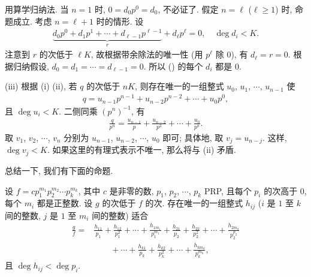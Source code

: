 \begin{pf}
    用算学归纳法. 当 $n = 1$ 时, $0 = d_0 p^0 = d_0$, 不必证了. 假定 $n = \ell$ ($\ell \geq 1$) 时, 命题成立. 考虑 $n = \ell + 1$ 时的情形. 设
    \begin{align*}
        {\underbrace{d_0 p^0 + d_1 p^1 + \cdots + d_{\ell - 1} p^{\ell - 1}}_{r}} + d_\ell p^\ell = 0, \quad \deg d_i < K.
    \end{align*}
    注意到 $r$ 的次低于 $\ell K$, 故根据带余除法的唯一性 (用 $p^\ell$ 除 $0$), 有 $d_\ell = r = 0$. 根据归纳假设, $d_0 = d_1 = \cdots = d_{\ell - 1} = 0$. 所以 () 的每个 $d_i$ 都是 $0$.

    (iii) 根据 (i) (ii), 若 $q$ 的次低于 $nK$, 则存在唯一的一组整式 $u_0$, $u_1$, $\cdots$, $u_{n-1}$ 使
    \begin{align*}
        q = u_{n-1} p^{n-1} + u_{n-2} p^{n-2} + \cdots + u_0 p^0,
    \end{align*}
    且 $\deg u_i < K$. 二侧同乘 $(p^n)^{-1}$, 有
    \begin{align*}
        \frac{q}{p^n} = \frac{u_{n-1}}{p} + \frac{u_{n-2}}{p^2} + \cdots + \frac{u_0}{p^n}.
    \end{align*}
    取 $v_1$, $v_2$, $\cdots$, $v_n$ 分别为 $u_{n-1}$, $u_{n-2}$, $\cdots$, $u_0$ 即可; 具体地, 取 $v_j = u_{n-j}$. 这样, $\deg v_j < K$. 如果这里的有理式表示不唯一, 那么将与 (ii) 矛盾.
\end{pf}

总结一下, 我们有下面的命题.
\begin{proposition}
    设 $f = c p_1^{m_1} p_2^{m_2} \cdots p_k^{m_k}$, 其中 $c$ 是非零的数, $p_1$, $p_2$, $\cdots$, $p_k$ PRP, 且每个 $p_i$ 的次高于 $0$, 每个 $m_i$ 都是正整数. 设 $g$ 的次低于 $f$ 的次. 存在唯一的一组整式 $h_{ij}$ ($i$ 是 $1$ 至 $k$ 间的整数, $j$ 是 $1$ 至 $m_i$ 间的整数) 适合
    \begin{align*}
        \frac{g}{f}
        = {} & \frac{h_{11}}{p_1} + \frac{h_{12}}{p_1^2} + \cdots + \frac{h_{1 m_1}}{p_1^{m_1}} + \frac{h_{21}}{p_2} + \frac{h_{22}}{p_2^2} + \cdots + \frac{h_{2 m_2}}{p_2^{p_2}} \\
             & \qquad + \cdots + \frac{h_{k1}}{p_k} + \frac{h_{k2}}{p_k^2} + \cdots + \frac{h_{k m_k}}{p_k^{m_k}},
    \end{align*}
    且 $\deg h_{ij} < \deg p_i$.
\end{proposition}

